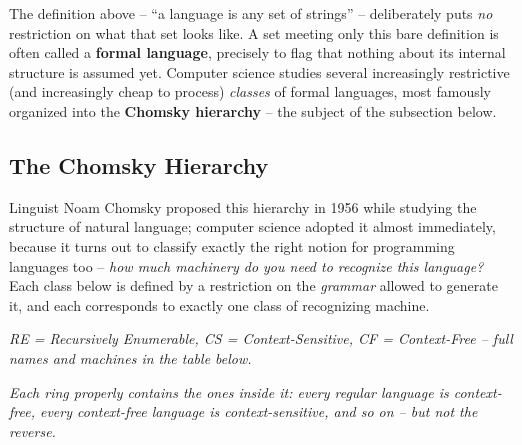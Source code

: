 \documentclass[full-course-notes.tex]{subfiles}
\begin{document}
\begin{coreidea}
The definition above -- ``a language is any set of strings'' -- deliberately puts \emph{no}
restriction on what that set looks like. A set meeting only this bare definition is often
called a \textbf{formal language}, precisely to flag that nothing about its internal structure
is assumed yet. Computer science studies several increasingly restrictive (and increasingly
cheap to process) \emph{classes} of formal languages, most famously organized into the
\textbf{Chomsky hierarchy} -- the subject of the subsection below.
\end{coreidea}

\subsection{The Chomsky Hierarchy}
\label{sec:l3-chomsky-hierarchy}

\dbtag Linguist Noam Chomsky proposed this hierarchy in 1956 while studying the structure of
natural language; computer science adopted it almost immediately, because it turns out to
classify exactly the right notion for programming languages too -- \emph{how much machinery do
you need to recognize this language?} Each class below is defined by a restriction on the
\emph{grammar} allowed to generate it, and each corresponds to exactly one class of recognizing
machine.

\begin{center}
\end{center}
\begin{center}
\small\textit{RE = Recursively Enumerable, CS = Context-Sensitive, CF = Context-Free -- full
names and machines in the table below.}
\end{center}
\begin{center}
\small\textit{Each ring properly \emph{contains} the ones inside it: every regular language is
context-free, every context-free language is context-sensitive, and so on -- but not the
reverse.}
\end{center}
\end{document}
